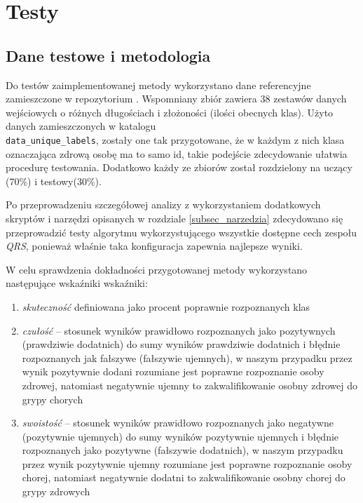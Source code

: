\section{Testy}
\label{sec_testy}

\subsection{Dane testowe i metodologia}
Do testów zaimplementowanej metody wykorzystano dane referencyjne zamieszczone w repozytorium \cite{ref_data_repo}. Wspomniany zbiór zawiera 38 zestawów danych wejściowych o różnych długościach i złożoności (ilości obecnych klas). Użyto danych zamieszczonych w katalogu \\ \texttt{data\_unique\_labels}, zostały one tak przygotowane, że w każdym z nich klasa oznaczająca zdrową osobę ma to samo id, takie podejście zdecydowanie ułatwia procedurę testowania. Dodatkowo każdy ze zbiorów został rozdzielony na uczący (70\%) i testowy(30\%). 

Po przeprowadzeniu szczegółowej analizy z wykorzystaniem dodatkowych skryptów i narzędzi opisanych w rozdziale \ref{subsec_narzedzia} zdecydowano się przeprowadzić testy algorytmu wykorzystującego wszystkie dostępne cech zespołu \textit{QRS}, ponieważ właśnie taka konfiguracja zapewnia najlepsze wyniki.

W celu sprawdzenia dokładności przygotowanej metody wykorzystano następujące wskaźniki wskaźniki:

\begin{enumerate}
\item \textit{skuteczność} definiowana jako procent poprawnie rozpoznanych klas
\item \textit{czułość} -- stosunek wyników prawidłowo rozpoznanych jako pozytywnych (prawdziwie dodatnich) do sumy wyników prawdziwie dodatnich i błędnie rozpoznanych jak fałszywe (fałszywie ujemnych), w naszym przypadku przez wynik pozytywnie dodani rozumiane jest poprawne rozpoznanie osoby zdrowej, natomiast negatywnie ujemny to zakwalifikowanie osobny zdrowej do grypy chorych

\item \textit{swoistość} -- stosunek wyników prawidłowo rozpoznanych jako negatywne (pozytywnie ujemnych) do sumy wyników pozytywnie ujemnych i błędnie rozpoznanych jako pozytywne (fałszywie dodatnich), w naszym przypadku przez wynik pozytywnie ujemny rozumiane jest poprawne rozpoznanie osoby chorej, natomiast negatywnie dodatni to zakwalifikowanie osobny chorej do grypy zdrowych
\end{enumerate} 

